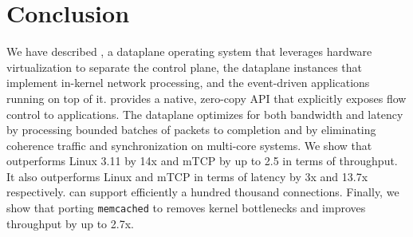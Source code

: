 
\section{Conclusion}

We have described \ix, a dataplane operating system that leverages
hardware virtualization to separate the control plane, the \ix
dataplane instances that implement in-kernel network processing, and
the event-driven applications running on top of it.  \ix provides a
native, zero-copy API that explicitly exposes flow control to
applications. The \ix dataplane optimizes for both bandwidth and
latency by processing bounded batches of packets to completion and by
eliminating coherence traffic and synchronization on multi-core
systems. We show that \ix outperforms Linux 3.11 by 14x and mTCP by up
to 2.5 in terms of throughput. It also outperforms Linux and mTCP in
terms of latency by 3x and 13.7x respectively. \ix can support
efficiently a hundred thousand connections. Finally, we show that
porting \texttt{memcached} to \ix removes kernel bottlenecks and
improves throughput by up to 2.7x.


